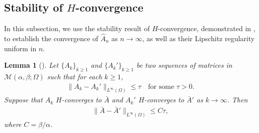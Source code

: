 \documentclass[reqno,12pt]{amsart} %
\newtheorem{lemma}[theorem]{Lemma}
\theoremstyle{definition}
\theoremstyle{remark}
\numberwithin{equation}{section}
\newcommand{\M}{\mathcal{M}}
\newcommand{\e}{\varepsilon}
\newcommand{\jz}[1]{\textcolor{red}{#1}}
\begin{document}
\subsection{\texorpdfstring{Stability of $H$-convergence}{Stability of H-convergence}}\label{sec_stability-H}

In this subsection, we use the stability result of $H$-convergence, demonstrated in \cite[etc.]{Boccardo1982, Ene1997, T09}, to establish the convergence of $\widehat{A}_n$ as $n\to \infty$, as well as their Lipschitz regularity uniform in $n$.

\begin{lemma}[{\cite[Lemma 10.9]{T09}}]\label{qual-homog_lem_stability}
  Let $\{A_k\}_{k\geq 1}$ and $\{A_k'\}_{k\geq 1}$ be two sequences of matrices in $\mathcal{M}(\alpha, \beta; \Omega)$ such that for each $k\geq 1$,
  \begin{align*}
    \|A_k-A_k'\|_{L^\infty(\Omega)}\leq \tau\quad \text{for some }\tau>0.
  \end{align*}
  Suppose that $A_k$ $H$-converges to $\bar{A}$ and $A_k'$ $H$-converges to $\bar{A}'$ as $k\rightarrow \infty$. Then
  \begin{align*}
    \|\bar{A}-\bar{A}'\|_{L^\infty(\Omega)}\leq C\tau,
  \end{align*}
where $C = \beta/\alpha$. 
\end{lemma}
\end{document}
